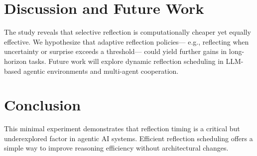 \documentclass[conference]{IEEEtran}
\begin{document}
\section{Discussion and Future Work}
The study reveals that selective reflection
is computationally cheaper yet equally effective.
We hypothesize that adaptive reflection policies---
e.g., reflecting when uncertainty or surprise exceeds a threshold---
could yield further gains in long-horizon tasks.
Future work will explore dynamic reflection scheduling
in LLM-based agentic environments and multi-agent cooperation.

\section{Conclusion}
This minimal experiment demonstrates that reflection timing
is a critical but underexplored factor in agentic AI systems.
Efficient reflection scheduling offers a simple way
to improve reasoning efficiency without architectural changes.




\end{document}
